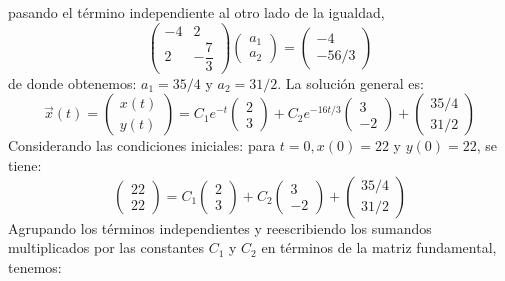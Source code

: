 \begin{ejemplo}
\begin{equation}
	\end{equation}
	pasando el término independiente al otro lado de la igualdad,
	\begin{equation}
		\begin{pmatrix}
			-4 & 2\\ 
			2 & -\dfrac{7}{3}
		\end{pmatrix}\begin{pmatrix}	a_1 \\ a_2	\end{pmatrix} = \begin{pmatrix}	-4 \\ -	56/3\end{pmatrix}
	\end{equation}
	de donde obtenemos: $a_1 = 35/4$ y $a_2 = 31/2.$ La solución general es:
	\begin{equation}
		\vec{x}(t) = \begin{pmatrix}	x(t) \\ y(t)	\end{pmatrix} = C_1e^{-t}\begin{pmatrix}	2 \\ 3	\end{pmatrix} + C_2e^{-16t/3}\begin{pmatrix}	3 \\ -2	\end{pmatrix} + \begin{pmatrix}	35/4 \\ 31/2	\end{pmatrix}
	\end{equation}
	Considerando las condiciones iniciales: para $t=0, x(0) = 22$ y $y(0) = 22$, se tiene:
	\begin{equation}
		\begin{pmatrix}	22 \\ 22	\end{pmatrix} = C_1 \begin{pmatrix}	2 \\ 3	\end{pmatrix} + C_2 \begin{pmatrix}	3 \\ -2	\end{pmatrix} + \begin{pmatrix}	35/4 \\ 31/2	\end{pmatrix}
	\end{equation}
	Agrupando los términos independientes y reescribiendo los sumandos multiplicados
	por las constantes $C_1$ y $C_2$ en términos de la matriz fundamental, tenemos:

\end{ejemplo}
